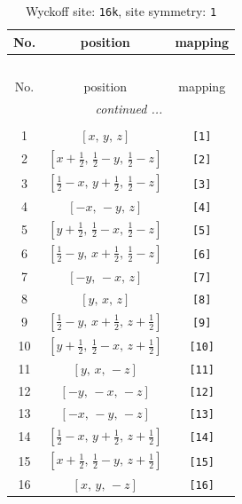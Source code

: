 \documentclass[fleqn,8pt]{jsarticle}
\begin{document}
\begin{longtable}{ccc}
\caption{Wyckoff site: {\tt 16k}, site symmetry: {\tt 1}}
 \\
 \hline \hline
No. & position & mapping \\ \hline \endfirsthead

\multicolumn{2}{l}{\tablename\ \thetable{}} \\
 \hline \hline
No. & position & mapping \\ \hline \endhead

 \hline \hline
\multicolumn{2}{r}{\footnotesize\it continued ...} \\ \endfoot

 \hline \hline
\multicolumn{2}{r}{} \\ \endlastfoot

1 & $\left[ x,\, y,\, z \right]$ & {\tt [1]} \\ \hline
2 & $\left[ x + \frac{1}{2},\, \frac{1}{2} - y,\, \frac{1}{2} - z \right]$ & {\tt [2]} \\ \hline
3 & $\left[ \frac{1}{2} - x,\, y + \frac{1}{2},\, \frac{1}{2} - z \right]$ & {\tt [3]} \\ \hline
4 & $\left[ - x,\, - y,\, z \right]$ & {\tt [4]} \\ \hline
5 & $\left[ y + \frac{1}{2},\, \frac{1}{2} - x,\, \frac{1}{2} - z \right]$ & {\tt [5]} \\ \hline
6 & $\left[ \frac{1}{2} - y,\, x + \frac{1}{2},\, \frac{1}{2} - z \right]$ & {\tt [6]} \\ \hline
7 & $\left[ - y,\, - x,\, z \right]$ & {\tt [7]} \\ \hline
8 & $\left[ y,\, x,\, z \right]$ & {\tt [8]} \\ \hline
9 & $\left[ \frac{1}{2} - y,\, x + \frac{1}{2},\, z + \frac{1}{2} \right]$ & {\tt [9]} \\ \hline
10 & $\left[ y + \frac{1}{2},\, \frac{1}{2} - x,\, z + \frac{1}{2} \right]$ & {\tt [10]} \\ \hline
11 & $\left[ y,\, x,\, - z \right]$ & {\tt [11]} \\ \hline
12 & $\left[ - y,\, - x,\, - z \right]$ & {\tt [12]} \\ \hline
13 & $\left[ - x,\, - y,\, - z \right]$ & {\tt [13]} \\ \hline
14 & $\left[ \frac{1}{2} - x,\, y + \frac{1}{2},\, z + \frac{1}{2} \right]$ & {\tt [14]} \\ \hline
15 & $\left[ x + \frac{1}{2},\, \frac{1}{2} - y,\, z + \frac{1}{2} \right]$ & {\tt [15]} \\ \hline
16 & $\left[ x,\, y,\, - z \right]$ & {\tt [16]} \\
\end{longtable}
\end{document}
